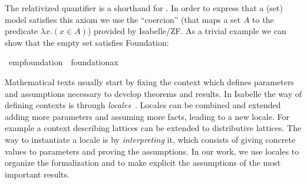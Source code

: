 \noindent The relativized quantifier
 is a shorthand for \isa{{\isasymforall}x{\isachardot}\ M(x)
  {\isasymlongrightarrow} P(x)}. In order to express that a (set) model
satisfies this axiom we use  the ``coercion''
 (that maps a set $A$ to the predicate
$\lambda x . (x\in A)$) provided by Isabelle/ZF. As a trivial example we
can show that the empty set satisfies Foundation:
\begin{isabelle}
\isamarkupfalse%
\ emp{\isacharunderscore}foundation\ {\isacharcolon}\ {\isachardoublequoteopen}foundation{\isacharunderscore}ax{\isacharparenleft}{\isacharhash}{\isacharhash}{}{\isacharparenright}{\isachardoublequoteclose}
\end{isabelle}




Mathematical texts usually start by fixing the context which defines
parameters and assumptions necessary to develop theorems
and results. In Isabelle the way of defining contexts is through
\emph{locales}~\cite{ballarin2010tutorial}.
Locales can be combined and extended adding more parameters and assuming
more facts, leading to a new locale. For example a context describing
lattices can be extended to distributive lattices.
The way to instantiate a locale is by \emph{interpreting} it, which consists
of giving concrete values to parameters and proving the assumptions.
In our work, we use locales to organize the formalization and to make
explicit the assumptions of the most important results.



